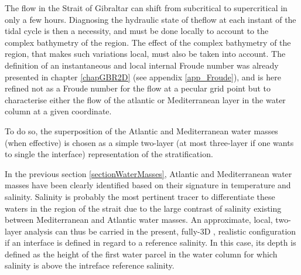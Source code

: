 
The flow in the Strait of Gibraltar can shift from subcritical to supercritical in only a few hours. Diagnosing the hydraulic state of theflow at each instant of the tidal cycle is then a necessity, and must be done locally to account to the complex bathymetry of the region. The effect of the complex bathymetry of the region, that makes such variations local, must also be taken into account. The definition of an instantaneous and local internal Froude number was already presented in chapter \ref{chapGBR2D} (see appendix \ref{app_Froude}), and is here refined not as a Froude number for the flow at a pecular grid point but to characterise either the flow of the atlantic or Mediterranean layer in the water column at a given coordinate.



To do so,  the superposition of the Atlantic and Mediterranean water masses (when effective) is chosen as a simple two-layer (at most three-layer if one wants to single the interface) representation of the stratification.

In the previous section \ref{sectionWaterMasses}, Atlantic and Mediterranean water masses have been clearly identified based on their signature in temperature and salinity. Salinity is probably the most pertinent tracer to differentiate these waters in the region of the strait due to the large contrast of salinity existing between Mediterranean and Atlantic water masses.
An approximate, local, two-layer analysis can thus be carried in the present, fully-3D , realistic configuration if an interface is defined in regard to a reference salinity. In this case, its depth is defined as the height of the first water parcel in the water column for which salinity is above the intreface reference salinity.

